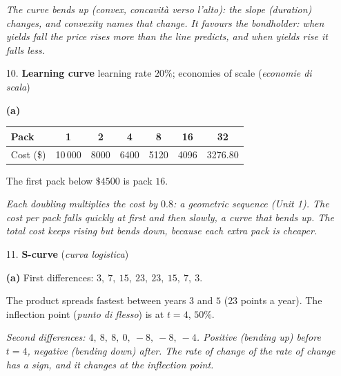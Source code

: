 \documentclass[12pt, twoside]{article}
\newcommand{\ita}[1]{(\emph{#1})}
\begin{document}
\begin{enumerate}[itemsep=0.3cm]
\emph{The curve bends up (convex, concavità verso l'alto): the slope
(duration) changes, and convexity names that change. It favours the
bondholder: when yields fall the price rises more than the line predicts,
and when yields rise it falls less.}

\item[10.] \textbf{Learning curve} \quad learning rate $20\%$; economies of
scale \ita{economie di scala}

\textbf{(a)}
\begin{tabular}{l|cccccc}
  Pack & 1 & 2 & 4 & 8 & 16 & 32 \\ \hline
  Cost (\$) & 10\,000 & 8000 & 6400 & 5120 & 4096 & 3276.80 \\
\end{tabular}

The first pack below $\$4500$ is pack $16$.

\emph{Each doubling multiplies the cost by $0.8$: a geometric sequence
(Unit 1). The cost per pack falls quickly at first and then slowly, a curve
that bends up. The total cost keeps rising but bends down, because each
extra pack is cheaper.}

\item[11.] \textbf{S-curve} \ita{curva logistica}

\textbf{(a)} First differences: $3,\ 7,\ 15,\ 23,\ 23,\ 15,\ 7,\ 3$.

The product spreads fastest between years $3$ and $5$ ($23$ points a
year). The inflection point \ita{punto di flesso} is at $t = 4$, $50\%$.

\emph{Second differences: $4,\ 8,\ 8,\ 0,\ -8,\ -8,\ -4$. Positive (bending
up) before $t = 4$, negative (bending down) after. The rate of change of
the rate of change has a sign, and it changes at the inflection point.}

\end{enumerate}
\end{document}
